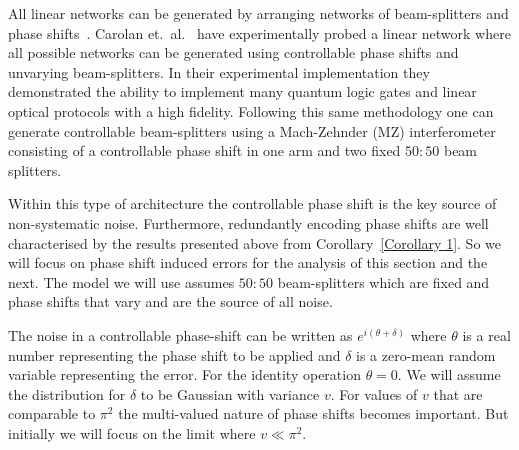 \documentclass[aps,pra,twocolumn,superscriptaddress,numerical,floatfix]{revtex4-1}
\begin{document}


All linear networks can be generated by arranging networks of beam-splitters and phase shifts~\cite{reck}.  Carolan et.~al.~\cite{ULO} have experimentally probed a linear network where all possible networks can be generated using controllable phase shifts and unvarying beam-splitters.  In their experimental implementation they demonstrated the ability to implement many quantum logic gates and linear optical protocols with a high fidelity.  Following this same methodology one can generate controllable beam-splitters using a Mach-Zehnder (MZ) interferometer consisting of a controllable phase shift in one arm and two fixed $50:50$ beam splitters.

Within this type of architecture the controllable phase shift is the key source of non-systematic noise.  Furthermore, redundantly encoding phase shifts are well characterised by the results presented above from Corollary~\ref{Corollary 1}.  So we will focus on phase shift induced errors for the analysis of this section and the next.  The model we will use assumes $50:50$ beam-splitters which are fixed and phase shifts that vary and are the source of all noise.

The noise in a controllable phase-shift can be written as $e^{i(\theta+\delta)}$ where $\theta$ is a real number representing the phase shift to be applied and $\delta$ is a zero-mean random variable representing the error.  For the identity operation $\theta=0$.  We will assume the distribution for $\delta$ to be Gaussian with variance $v$.  For values of $v$ that are comparable to $\pi^2$ the multi-valued nature of phase shifts becomes important.  But initially we will focus on the limit where $v \ll \pi^2$.

\end{document}

